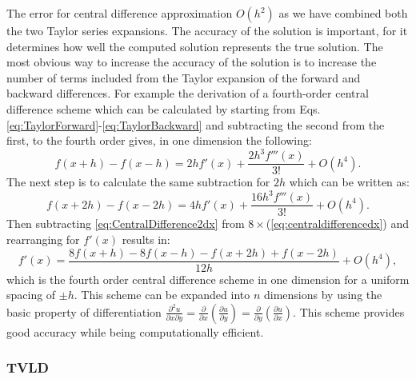 \documentclass[12pt,a4paper,twoside]{article}
\begin{document}
The  error for central difference approximation $O(h^{2})$ as we have combined both the two Taylor series expansions. The accuracy of the solution is important, for it determines how well the computed solution represents the true solution. The most obvious way to increase the accuracy of the solution is to increase the number of terms included from the Taylor expansion of the forward and backward differences. For example the derivation of a fourth-order central difference scheme which can be calculated by starting from Eqs. \eqref{eq:TaylorForward}-\eqref{eq:TaylorBackward} and subtracting the second from the first, to the fourth order gives, in one dimension the following:
\begin{equation}
f(x+h)-f(x-h)=2 h f'(x)+\frac{2 h^{3} f'''(x)}{3!}+O(h^{4}).\label{eq:centraldifferencedx}
\end{equation}
The next step is to calculate the same subtraction for $2 h$ which can be written as:
\begin{equation}
f(x+2 h)-f(x-2 h)=4 h f'(x)+\frac{16 h^{3}f'''(x)}{3!}+O(h^{4}).\label{eq:CentralDifference2dx}
\end{equation}
Then subtracting \eqref{eq:CentralDifference2dx} from $8\times$(\eqref{eq:centraldifferencedx}) and rearranging for $f'(x)$ results in:
\begin{equation}
f'(x)=\frac{8f(x+h)-8f(x-h)-f(x+2h)+f(x-2h)}{12h}+O(h^{4}),\label{eq:4thOrderCentralDifferenceUniform}
\end{equation}
which is the fourth order central difference scheme in one dimension for a uniform spacing of $\pm h$.
This scheme can be expanded into $n$ dimensions by using the basic property of differentiation $\frac{\partial^{2}u}{\partial x\partial y}=\frac{\partial}{\partial x}\left(\frac{\partial u}{\partial y}\right)=\frac{\partial}{\partial y}\left(\frac{\partial u}{\partial x}\right)$. This scheme provides good accuracy while being computationally efficient.
\subsubsection{TVLD}
\newpage


\newpage
\end{document}
